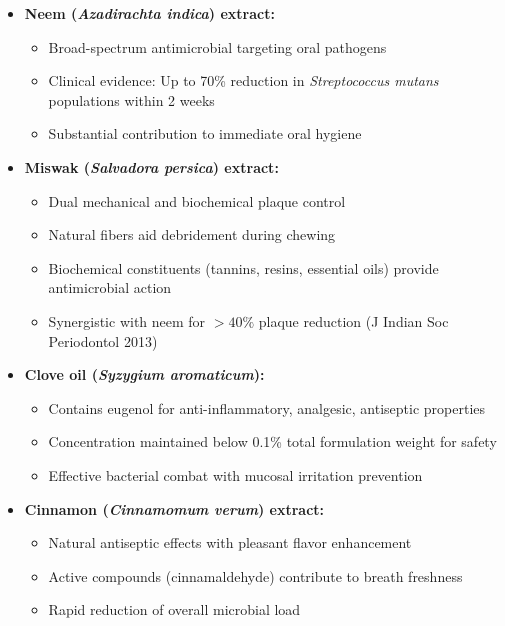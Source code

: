 \documentclass[12pt]{article}
\begin{document}
\begin{itemize}
    \item \textbf{Neem (\textit{Azadirachta indica}) extract:}
    \begin{itemize}
        \item Broad-spectrum antimicrobial targeting oral pathogens
        \item Clinical evidence: Up to 70\% reduction in \textit{Streptococcus mutans} populations within 2 weeks
        \item Substantial contribution to immediate oral hygiene
    \end{itemize}
    
    \item \textbf{Miswak (\textit{Salvadora persica}) extract:}
    \begin{itemize}
        \item Dual mechanical and biochemical plaque control
        \item Natural fibers aid debridement during chewing
        \item Biochemical constituents (tannins, resins, essential oils) provide antimicrobial action
        \item Synergistic with neem for $>40\%$ plaque reduction (J Indian Soc Periodontol 2013)
    \end{itemize}
    
    \item \textbf{Clove oil (\textit{Syzygium aromaticum}):}
    \begin{itemize}
        \item Contains eugenol for anti-inflammatory, analgesic, antiseptic properties
        \item Concentration maintained below 0.1\% total formulation weight for safety
        \item Effective bacterial combat with mucosal irritation prevention
    \end{itemize}
    
    \item \textbf{Cinnamon (\textit{Cinnamomum verum}) extract:}
    \begin{itemize}
        \item Natural antiseptic effects with pleasant flavor enhancement
        \item Active compounds (cinnamaldehyde) contribute to breath freshness
        \item Rapid reduction of overall microbial load
    \end{itemize}
\end{itemize}
\end{document}
